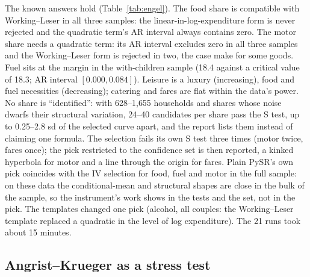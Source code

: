 The known answers hold (Table~\ref{tab:engel}). The food share is compatible with Working--Leser in all three samples: the linear-in-log-expenditure form is never rejected and the quadratic term's AR interval always contains zero. The motor share needs a quadratic term: its AR interval excludes zero in all three samples and the Working--Leser form is rejected in two, the case \citet{bankslewbel1997} make for some goods. Fuel sits at the margin in the with-children sample (18.4 against a critical value of 18.3; AR interval $[0.000, 0.084]$). Leisure is a luxury (increasing), food and fuel necessities (decreasing); catering and fares are flat within the data's power. No share is ``identified'': with 628--1{,}655 households and shares whose noise dwarfs their structural variation, 24--40 candidates per share pass the S test, up to 0.25--2.8 sd of the selected curve apart, and the report lists them instead of claiming one formula. The selection fails its own S test three times (motor twice, fares once); the pick restricted to the confidence set is then reported, a kinked hyperbola for motor and a line through the origin for fares. Plain PySR's own pick coincides with the IV selection for food, fuel and motor in the full sample: on these data the conditional-mean and structural shapes are close in the bulk of the sample, so the instrument's work shows in the tests and the set, not in the pick. The templates changed one pick (alcohol, all couples: the Working--Leser template replaced a quadratic in the level of log expenditure). The 21 runs took about 15 minutes.

\subsection{Angrist--Krueger as a stress test}
\label{sec:ak}

